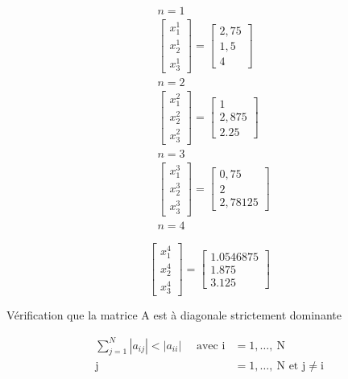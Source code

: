 \documentclass[10pt]{article}
\begin{document}
\[
\begin{aligned}
& n=1 \\
& {\left[\begin{array}{l}
x_{1}^{1} \\
x_{2}^{1} \\
x_{3}^{1}
\end{array}\right]=\left[\begin{array}{c}
2,75 \\
1,5 \\
4
\end{array}\right]} \\
& n=2 \\
& {\left[\begin{array}{l}
x_{1}^{2} \\
x_{2}^{2} \\
x_{3}^{2}
\end{array}\right]=\left[\begin{array}{c}
1 \\
2,875 \\
2.25
\end{array}\right]} \\
& n=3 \\
& {\left[\begin{array}{l}
x_{1}^{3} \\
x_{2}^{3} \\
x_{3}^{3}
\end{array}\right]=\left[\begin{array}{c}
0,75 \\
2 \\
2,78125
\end{array}\right]} \\
& n=4
\end{aligned}
\]

\[
\left[\begin{array}{l}
x_{1}^{4} \\
x_{2}^{4} \\
x_{3}^{4}
\end{array}\right]=\left[\begin{array}{c}
1.0546875 \\
1.875 \\
3.125
\end{array}\right]
\]

Vérification que la matrice A est à diagonale strictement dominante

\[
\begin{aligned}
\sum_{j=1}^{N}\left|a_{i j}\right|<\left|a_{i i}\right| \quad \text { avec } \mathrm{i} & =1, \ldots, \mathrm{~N} \\
\mathrm{j} & =1, \ldots, \mathrm{~N} \text { et } \mathrm{j} \neq \mathrm{i}
\end{aligned}
\]
\end{document}
